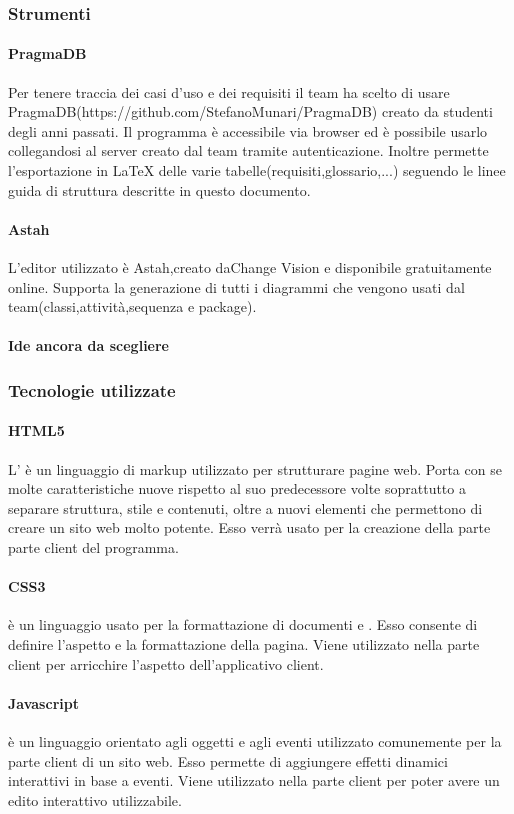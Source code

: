 \begin{itemize}
	\subsubsection{Strumenti}
		\paragraph{PragmaDB}
		Per tenere traccia dei casi d'uso e dei requisiti il team ha scelto di usare PragmaDB(https://github.com/StefanoMunari/PragmaDB) creato da studenti degli anni passati. Il programma è accessibile via browser ed è possibile usarlo collegandosi al server creato dal team tramite autenticazione. Inoltre permette l'esportazione in \LaTeX{} delle varie tabelle(requisiti,glossario,...) seguendo le linee guida di struttura descritte in questo documento.
		\paragraph{Astah}
		L'editor  utilizzato è Astah,creato daChange Vision e disponibile gratuitamente online. Supporta la generazione di tutti i diagrammi che vengono usati dal team(classi,attività,sequenza e package).
		\paragraph{Ide ancora da scegliere}
	\subsubsection{Tecnologie utilizzate}
	\paragraph{HTML5}
	L' è un linguaggio di markup utilizzato per strutturare pagine web. Porta con se molte caratteristiche nuove rispetto al suo predecessore volte soprattutto a separare struttura, stile e contenuti, oltre a nuovi elementi che permettono di creare un sito web molto potente.
	Esso verrà usato per la creazione della parte parte client del programma.
	\paragraph{CSS3}
	 è un linguaggio usato per la formattazione di documenti  e . Esso consente di definire l'aspetto e la formattazione della pagina. Viene utilizzato nella parte client per arricchire l'aspetto dell'applicativo client.
	\paragraph{Javascript}
	 è un linguaggio orientato agli oggetti e agli eventi utilizzato comunemente per la parte client di un sito web. Esso permette di aggiungere effetti dinamici interattivi in base a eventi.
	Viene utilizzato nella parte client per poter avere un edito interattivo utilizzabile.%

\end{itemize}
